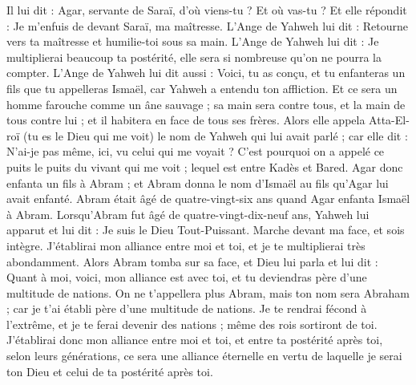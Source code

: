 \begin{multicols}{2}
Il lui dit : Agar, servante de Saraï, d'où viens-tu ? Et où vas-tu ? Et elle répondit : Je m'enfuis de devant Saraï, ma maîtresse.
L'Ange de Yahweh lui dit : Retourne vers ta maîtresse et humilie-toi sous sa main.
L'Ange de Yahweh lui dit : Je multiplierai beaucoup ta postérité, elle sera si nombreuse qu'on ne pourra la compter.
L'Ange de Yahweh lui dit aussi : Voici, tu as conçu, et tu enfanteras un fils que tu appelleras Ismaël, car Yahweh a entendu ton affliction.
Et ce sera un homme farouche comme un âne sauvage ; sa main sera contre tous, et la main de tous contre lui ; et il habitera en face de tous ses frères.
Alors elle appela Atta-El-roï (tu es le Dieu qui me voit) le nom de Yahweh qui lui avait parlé ; car elle dit : N'ai-je pas même, ici, vu celui qui me voyait ?
C'est pourquoi on a appelé ce puits le puits du vivant qui me voit ; lequel est entre Kadès et Bared.
Agar donc enfanta un fils à Abram ; et Abram donna le nom d’Ismaël  au fils qu'Agar lui avait enfanté.
Abram était âgé de quatre-vingt-six ans quand Agar enfanta Ismaël à Abram.
\VerseOne{}Lorsqu’Abram fut âgé de quatre-vingt-dix-neuf ans, Yahweh lui apparut et lui dit : Je suis le Dieu Tout-Puissant. Marche devant ma face, et sois intègre.
J’établirai mon alliance entre moi et toi, et je te multiplierai très abondamment.
Alors Abram tomba sur sa face, et Dieu lui parla et lui dit :
Quant à moi, voici, mon alliance est avec toi, et tu deviendras père d'une multitude de nations.
On ne t’appellera plus Abram, mais ton nom sera Abraham ; car je t'ai établi père d'une multitude de nations.
Je te rendrai fécond  à l’extrême, et je te ferai devenir des nations ; même des rois sortiront de toi.
J'établirai donc mon alliance entre moi et toi, et entre ta postérité après toi, selon leurs générations, ce sera une alliance éternelle en vertu de laquelle je serai ton Dieu et celui de ta postérité après toi.

\end{multicols}
